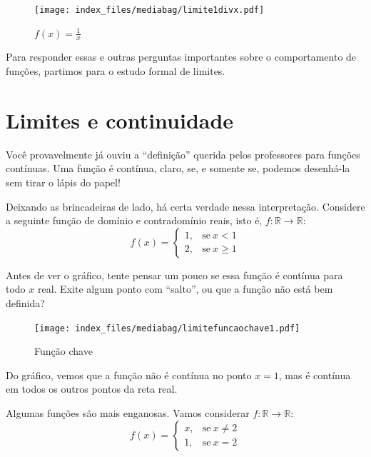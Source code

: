 \documentclass[
  portuguese,
  letterpaper,
  DIV=11,
  numbers=noendperiod]{scrreport}
\begin{document}
\begin{figure}[H]

\caption{\(f(x) = \frac{1}{x}\)}

{\centering \texttt{[image: index\_files/mediabag/limite1divx.pdf]}

}

\end{figure}%

Para responder essas e outras perguntas importantes sobre o
comportamento de funções, partimos para o estudo formal de limites.

\section{Limites e continuidade}\label{limites-e-continuidade}

Você provavelmente já ouviu a ``definição'' querida pelos professores
para funções contínuas. Uma função é contínua, claro, se, e somente se,
podemos desenhá-la sem tirar o lápis do papel!

Deixando as brincadeiras de lado, há certa verdade nessa interpretação.
Considere a seguinte função de domínio e contradomínio reais, isto é,
\(f : \mathbb{R} \rightarrow \mathbb {R}\): \[
f(x) =\left\{\begin{array}{ll}
1, & \mathrm{se}\ x < 1 \\
2, & \mathrm{se}\ x \geq 1
\end{array}\right.
\]

Antes de ver o gráfico, tente pensar um pouco se essa função é contínua
para todo \(x\) real. Exite algum ponto com ``salto'', ou que a função
não está bem definida?

\begin{figure}[H]

\caption{Função chave}

{\centering \texttt{[image: index\_files/mediabag/limitefuncaochave1.pdf]}

}

\end{figure}%

Do gráfico, vemos que a função não é contínua no ponto \(x=1\), mas é
contínua em todos os outros pontos da reta real.

Algumas funções são mais enganosas. Vamos considerar
\(f : \mathbb{R} \rightarrow \mathbb{R}\): \[
f(x) =\left\{\begin{array}{ll}
x, & \mathrm{se}\ x \neq 2 \\
1, & \mathrm{se}\ x = 2
\end{array}\right.
\]
\end{document}
